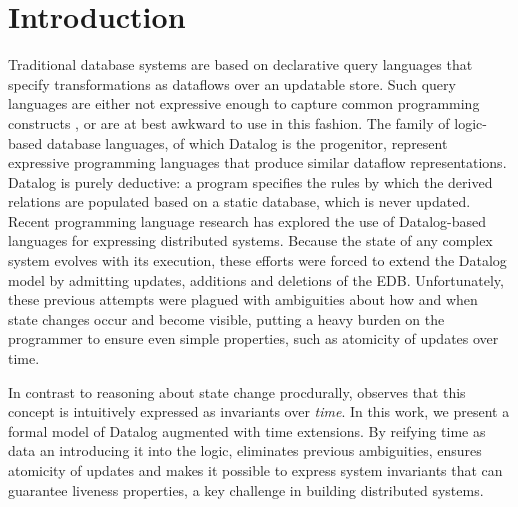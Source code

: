 \section{Introduction}






Traditional database systems are based on declarative query languages that
specify transformations as dataflows over an updatable store.  Such query
languages are either not expressive enough to capture common programming
constructs , or are at best awkward to use in this fashion.
 The family of logic-based database languages, of
which Datalog is the progenitor, represent expressive programming languages
that produce similar dataflow representations.  Datalog is purely deductive: a
program specifies the rules by which the derived relations are populated based
on a static database, which is never updated.  Recent programming language
research has explored the use of Datalog-based languages for expressing
distributed systems.  Because the state of any complex system evolves with its
execution, these efforts were forced to extend the Datalog model by admitting
updates, additions and deletions of the EDB.  Unfortunately, these previous
attempts were plagued with ambiguities about how and when state changes occur
and become visible, putting a heavy burden on the programmer to ensure even
simple properties, such as atomicity of updates over time.

In contrast to reasoning about state change procdurally, \lang observes
that this concept is intuitively expressed as invariants over {\em time}.  In
this work, we present a formal model of Datalog augmented with time extensions.
By reifying time as data an introducing it into the logic, \lang eliminates
previous ambiguities, ensures atomicity of updates and makes it possible to
express system invariants that can guarantee liveness properties, a key
challenge in building distributed systems.
